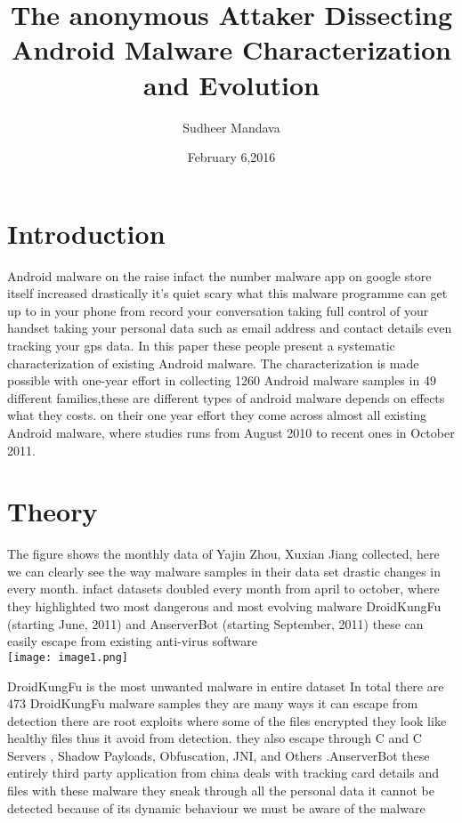 \documentclass[10pt]{article}
\title{ The anonymous Attaker Dissecting Android Malware Characterization and Evolution }
\author{Sudheer Mandava}
\date{February 6,2016}
\begin{document}
\maketitle
\section {Introduction }

Android  malware on the raise infact the number malware app on google store itself increased drastically it's quiet scary what this malware programme can get up to in your phone from record your conversation taking full control of your handset taking your personal data such as email address and contact details even tracking your gps data.  In this paper these people  present a systematic characterization of existing Android malware. The characterization is made possible with one-year effort in collecting 1260 Android malware samples in 49 different families,these are different types of android malware depends on effects what they costs. on their one year effort they come across almost all existing Android malware, where studies runs from August 2010 to recent ones in October 2011.\\


\section {Theory} 


The figure shows the monthly data of  Yajin Zhou, Xuxian Jiang collected, here we can clearly see the way malware samples in their data set drastic changes in every month. infact datasets doubled every month from april to october, where they highlighted two most dangerous and most evolving malware DroidKungFu (starting June, 2011) and AnserverBot (starting September, 2011) these can easily escape from existing anti-virus software   \\


\texttt{[image: image1.png]}


DroidKungFu is the most unwanted malware in entire dataset In total there are 473 DroidKungFu malware samples  they are many ways it can escape from detection there are root exploits where some of the files encrypted they look like healthy files thus it avoid from detection.  they also escape through  C and C Servers , Shadow Payloads, Obfuscation, JNI, and Others .AnserverBot these entirely third party application  from china deals with tracking card details and files with these malware they sneak through all the personal data it cannot be detected because of its dynamic behaviour we must be aware of the malware \\
\end{document}

